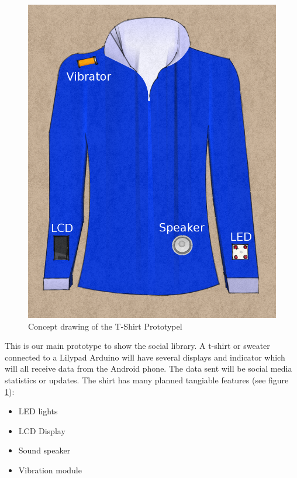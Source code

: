 \begin{figure}
  \vspace{-20pt}
  \begin{center}
    \includegraphics[scale=0.2]{img/testing-tshirtproto}
  \end{center}
  \vspace{-10pt}
  \caption{Concept drawing of the T-Shirt Prototypel}
  \label{fig:testing-TShirt}
  \vspace{-50pt}
\end{figure}

This is our main prototype to show the social library. A t-shirt or sweater connected to a Lilypad Arduino will have
several displays and indicator which will all receive data from the Android phone. The data sent will be social media 
statistics or updates. The shirt has many planned tangiable features (see figure \ref{fig:testing-TShirt}):

\begin{itemize}
\item LED lights
\item LCD Display
\item Sound speaker
\item Vibration module
\end{itemize}


